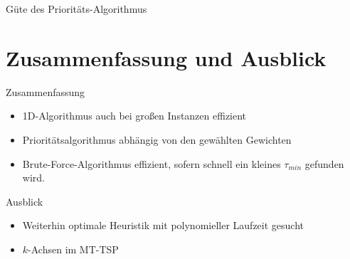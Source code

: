 \documentclass[10pt,table,xcolor=dvipsnames]{beamer}
\begin{document}
\begin{frame}{Güte des Prioritäts-Algorithmus}
\begin{table}
\centering
{}
\caption{Güte des Prioritäts-Algorithmus bei $\omega=(87,34,31)$ und $v_{\kappa}=61$.}
\label{tab:ExpGüte}
\end{table}
\end{frame}

\section{Zusammenfassung und Ausblick}
\begin{frame}{Zusammenfassung}
\begin{itemize}
\item
1D-Algorithmus auch bei großen Instanzen effizient 
\pause
\item
Prioritätsalgorithmus abhängig von den gewählten Gewichten 
\pause
\item
Brute-Force-Algorithmus effizient, sofern schnell ein kleines $\tau_{min}$ gefunden wird.
\end{itemize}
\end{frame}

\begin{frame}{Ausblick}
\begin{itemize}
\item
Weiterhin optimale Heuristik mit polynomieller Laufzeit gesucht 
\pause
\item
$k$-Achsen im MT-TSP
\end{itemize}
\end{frame}
\end{document}
